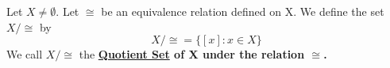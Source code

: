 \label{def:QuotientSet}
\newcommand{\QuotientSet}[0]{
    \bf \hyperref[def:QuotientSet]{Quotient Set} \rm
}
\newcommand{\QuoSet}[2]{
    #1
    /
    #2
}
\newcommand{\LetBeQuotientSet}[2]{
    Let \QuoSet{#1}{#2} be the \QuotientSet of #1 with respect to the relation #2.
}
\begin{df}  
    Let $X \neq \emptyset$.
    Let $\cong$ be an equivalence relation defined on X.
    We define the set $X/\cong$ by 
    \begin{equation}
        \QuoSet{X}{\cong} = \{ [x] : x \in X\}
    \end{equation}
    We call $\QuoSet{X}{\cong}$ the \QuotientSet of X under the relation $\cong$. 
\end{df} 